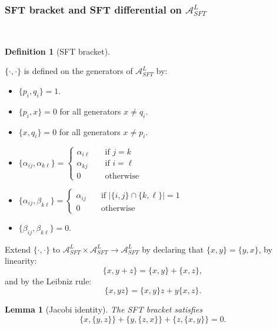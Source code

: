 \documentclass[a4paper,final, reqno]{amsart}
\theoremstyle{plain}
\newtheorem{Lemma}[Th]{Lemma}
\theoremstyle{definition}
\newtheorem{Def}[Th]{Definition}
\newcommand{\A}{\mathcal{A}}
\begin{document}
	
	
		
	
	
	\subsubsection{SFT bracket and SFT differential on $\A^L_{SFT}$}\-\
	
	
	
	
	
	\begin{Def}[SFT bracket] \-\
		
		$\{\cdot, \cdot\}$ is defined on the generators of $\A^L_{SFT}$ by:
		
		\begin{itemize}
			\item $\{p_i, q_i\} = 1$.
			\item $\{p_i, x\} = 0$ for all generators $x\neq q_i$.
			\item $\{x, q_i \} = 0$ for all generators $x\neq p_i$. 
			\item $\{\alpha_{ij}, \alpha_{k\ell}\} = \begin{cases}
				\alpha_{i\ell} & \quad \text{if } j=k \\
				\alpha_{kj} & \quad \text{if } i=\ell \\
				0 & \quad \text{otherwise}
			\end{cases}$ \\
			\item $\{\alpha_{ij}, \beta_{k\ell}\} = \begin{cases}
				\alpha_{ij} & \quad \text{if } |\{i,j\} \cap \{k,\ell\}| = 1 \\
				0 & \quad \text{otherwise}
			\end{cases}$
			\item $\{\beta_{ij}, \beta_{k\ell} \} = 0$.
		\end{itemize}
		
		Extend $\{\cdot, \cdot\}$ to $\A^L_{SFT}\times \A^L_{SFT}\to \A^L_{SFT}$ by declaring that $\{x,y\} = \{y,x\}$, by linearity:
		\[ \{x,y+z\} = \{x,y\} + \{x,z\},\]
		and by the Leibniz rule:
		\[ \{x,yz\} = \{x,y\} z + y\{x,z\}.\]
	\end{Def}
	
	\begin{Lemma}[Jacobi identity]
		The SFT bracket satisfies
		\[\{x,\{y,z\}\} + \{y,\{z,x\}\} + \{z,\{x,y\}\} = 0. \]
	\end{Lemma}
	
\end{document}
